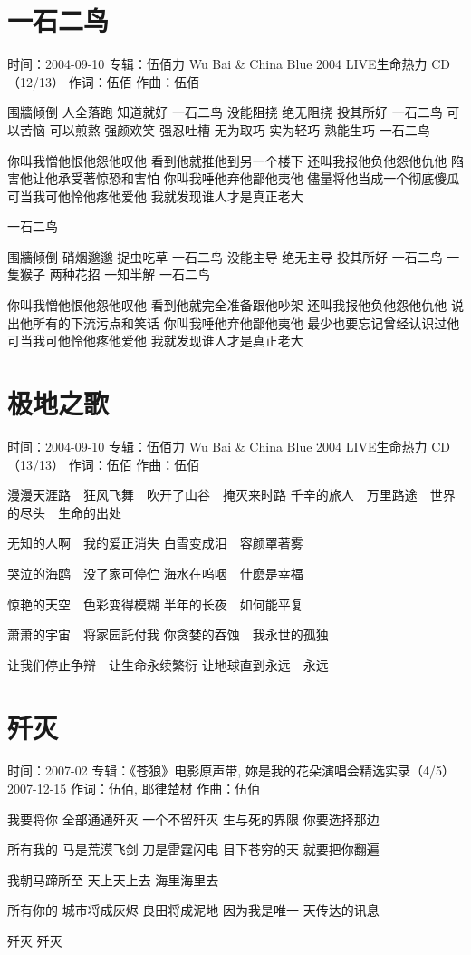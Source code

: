 \documentclass[UTF8,a4paper,oneside,twocolumn,12pt]{ctexbook}
\newcommand{\infopair}[2]{\textbullet #1：#2}
\newcommand{\zc}[1][伍佰]{\infopair{作词}{#1}}
\newcommand{\zq}[1][伍佰]{\infopair{作曲}{#1}}
\newcommand{\zj}[1]{\infopair{专辑}{#1}}
\newcommand{\sj}[1]{\infopair{时间}{#1}}
\newenvironment{info}{\begin{flushleft}\kaishu
	}
	{\end{flushleft}\normalsize\yahei\par}
\newenvironment{lyric}{
	}
{}
\begin{document}
\section{一石二鸟}
\begin{info}
	\sj{2004-09-10}
	\zj{伍佰力 Wu Bai \& China Blue 2004 LIVE生命热力 CD（12/13）}
	\zc
	\zq
\end{info}
\begin{lyric}
	围牆倾倒 人全落跑
	知道就好 一石二鸟
	没能阻挠 绝无阻挠
	投其所好 一石二鸟
	可以苦恼 可以煎熬
	强颜欢笑 强忍吐槽
	无为取巧 实为轻巧
	熟能生巧 一石二鸟

	你叫我憎他恨他怨他叹他
	看到他就推他到另一个楼下
	还叫我报他负他怨他仇他
	陷害他让他承受著惊恐和害怕
	你叫我唾他弃他鄙他夷他
	儘量将他当成一个彻底傻瓜
	可当我可他怜他疼他爱他
	我就发现谁人才是真正老大

	一石二鸟

	围牆倾倒 硝烟邈邈
	捉虫吃草 一石二鸟
	没能主导 绝无主导
	投其所好 一石二鸟
	一隻猴子 两种花招
	一知半解 一石二鸟

	你叫我憎他恨他怨他叹他
	看到他就完全准备跟他吵架
	还叫我报他负他怨他仇他
	说出他所有的下流污点和笑话
	你叫我唾他弃他鄙他夷他
	最少也要忘记曾经认识过他
	可当我可他怜他疼他爱他
	我就发现谁人才是真正老大
\end{lyric}

\section{极地之歌}
\begin{info}
	\sj{2004-09-10}
	\zj{伍佰力 Wu Bai \& China Blue 2004 LIVE生命热力 CD（13/13）}
	\zc
	\zq
\end{info}
\begin{lyric}
	漫漫天涯路　狂风飞舞　吹开了山谷　掩灭来时路
	千辛的旅人　万里路途　世界的尽头　生命的出处

	无知的人啊　我的爱正消失
	白雪变成泪　容颜罩著雾

	哭泣的海鸥　没了家可停伫
	海水在呜咽　什麽是幸福

	惊艳的天空　色彩变得模糊
	半年的长夜　如何能平复

	萧萧的宇宙　将家园託付我
	你贪婪的吞蚀　我永世的孤独

	让我们停止争辩　让生命永续繁衍
	让地球直到永远　永远
\end{lyric}

\section{歼灭}
\begin{info}
	\sj{2007-02}
	\zj{《苍狼》电影原声带, 妳是我的花朵演唱会精选实录（4/5） 2007-12-15}
	\zc[伍佰, 耶律楚材]
	\zq
\end{info}
\begin{lyric}
	我要将你
	全部通通歼灭
	一个不留歼灭
	生与死的界限
	你要选择那边

	所有我的
	马是荒漠飞剑
	刀是雷霆闪电
	目下苍穷的天
	就要把你翻遍

	我朝马蹄所至 天上天上去 海里海里去

	所有你的
	城市将成灰烬
	良田将成泥地
	因为我是唯一
	天传达的讯息

	歼灭 歼灭
\end{lyric}
\end{document}
